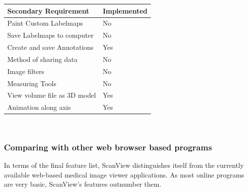 \documentclass[a4paper,11pt,twoside]{article}
\begin{document}
\begin{center}

  \begin{tabular}{| l | l |}
    \hline
    Secondary Requirement & Implemented \\ \hline \hline
	Paint Custom Labelmaps & No\\ \hline
	Save Labelmaps to computer & No \\ \hline
	Create and save Annotations & Yes \\ \hline
	Method of sharing data & No \\ \hline
	Image filters & No \\ \hline
	Measuring Tools & No \\ \hline
	View volume file as 3D model & Yes \\ \hline
	Animation along axis & Yes \\ \hline



  \end{tabular}\\
\end{center}









\subsubsection{Comparing with other web browser based programs}

In terms of the final feature list, ScanView distinguishes itself from the currently available web-based medical image viewer applications. As most online programs are very basic, ScanView's features outnumber them. 
\end{document}

